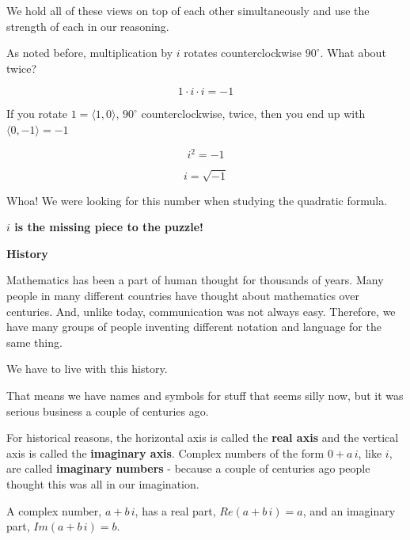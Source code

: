 \documentclass{ximera}
\begin{document}
We hold all of these views on top of each other simultaneously and use the strength of each in our reasoning.





As noted before, multiplication by $i$ rotates counterclockwise $90^{\circ}$. What about twice?


\[  1 \cdot i \cdot i = -1    \]



If you rotate $1 = \langle 1, 0 \rangle$, $90^{\circ}$ counterclockwise, twice, then  you end up with $\langle 0,-1 \rangle = -1$





\[   i^2 = -1\]



\[   i = \sqrt{-1}   \]




Whoa!  We were looking for this number when studying the quadratic formula.  


\begin{center}
\textbf{\textcolor{red!70!black}{$i$ is the missing piece to the puzzle!}}
\end{center}








\textbf{\textcolor{purple!50!blue!90!black}{History}}


Mathematics has been a part of human thought for thousands of years.  Many people in many different countries have thought about mathematics over centuries.  And, unlike today, communication was not always easy.  Therefore, we have many groups of people inventing different notation and language for the same thing.  

We have to live with this history.

That means we have names and symbols for stuff that seems silly now, but it was serious business a couple of centuries ago.

For historical reasons, the horizontal axis is called the \textbf{real axis} and the vertical axis is called the \textbf{imaginary axis}.  Complex numbers of the form $0 + a \, i$, like $i$, are called \textbf{imaginary numbers} - because a couple of centuries ago people thought this was all in our imagination.


A complex number, $a + b \, i$, has a real part, $Re(a + b \, i)= a$, and an imaginary part, $Im( a + b \, i)= b$.
\end{document}
